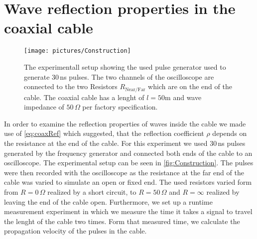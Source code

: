 \documentclass[a4paper,10pt,twocolumn]{article}
\begin{document}
    \section{Wave reflection properties in the coaxial cable}
    \label{sec:reflectionProperties}
    \begin{figure}[htbp]                                 %
        \begin{center}                                       %
            \texttt{[image: pictures/Construction]}      %
            \caption[]{The experimentall setup showing the used pulse generator used to generate $30\,$ns pulses. 
            The two channels of the oscilloscope are connected to the two Resistors $R_{\text{Near/Far}}$ which are on the end of the cable.
            The coaxial cable has a lenght of $l=50\text{m}$ and wave impedance of $50\,\Omega$ per factory specification.}   %
            \label{fig:Construction}                                      %
        \end{center}
    \end{figure}
    In order to examine the reflection properties of waves inside the cable we made use of \autoref{eq:coaxRef} which suggested, that the reflection
    coefficient $\rho$ depends on the resistance at the end of the cable.
    For this experiment we used $30\,$ns pulses generated by the frequency generator and connected both ends of the cable to an oscilloscope.
    The experimental setup can be seen in \autoref{fig:Construction}.
    The pulses were then recorded with the oscilloscope as the resistance at the far end of the cable was varied to simulate an open or fixed end.
    The used resistors varied form from $R=0\,\Omega $ realized by a short circuit, to $R=50\,\Omega$ and $R=\infty$ realized by leaving the end of the cable open.
    Furthermore, we set up a runtime measurement experiment in which we measure the time it takes a signal to travel the lenght of the cable two times.
    Form that measured time, we calculate the propagation velocity of the pulses in the cable.
    
\end{document}
